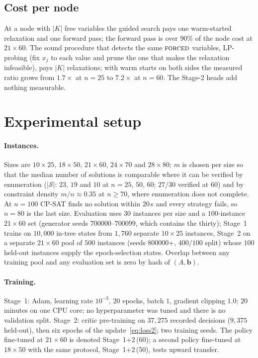 \documentclass[final,5p,times,twocolumn,authoryear]{elsarticle}
\newcommand{\SOL}{\mathcal{S}}
\newcommand{\FORCED}{\textsc{forced}}
\begin{document}
\subsection{Cost per node}
\label{sec:method-cost}

At a node with $|K|$ free variables the guided search pays one warm-started relaxation and one forward pass; the forward pass is over $90\%$ of the node cost at $21\times60$. The sound procedure that detects the same $\FORCED$ variables, LP-probing (fix $x_j$ to each value and prune the one that makes the relaxation infeasible), pays $|K|$ relaxations; with warm starts on both sides the measured ratio grows from $1.7\times$ at $n=25$ to $7.2\times$ at $n=60$. The Stage-2 heads add nothing measurable.

\section{Experimental setup}
\label{sec:setup}

\paragraph{Instances.} Sizes are $10\times25$, $18\times50$, $21\times60$, $24\times70$ and $28\times80$; $m$ is chosen per size so that the median number of solutions is comparable where it can be verified by enumeration ($|\SOL|$: $23$, $19$ and $10$ at $n=25$, $50$, $60$; $27/30$ verified at $60$) and by constraint density $m/n\approx0.35$ at $n\ge70$, where enumeration does not complete. At $n=100$ CP-SAT finds no solution within $20$\,s and every strategy fails, so $n=80$ is the last size. Evaluation uses $30$ instances per size and a $100$-instance $21\times60$ set (generator seeds $700000$--$700099$, which contains the thirty); Stage~1 trains on $10{,}000$ in-tree states from $1{,}760$ separate $10\times25$ instances, Stage~2 on a separate $21\times60$ pool of $500$ instances (seeds $800000$+, $400/100$ split) whose $100$ held-out instances supply the epoch-selection states. Overlap between any training pool and any evaluation set is zero by hash of $(A,\mathbf{b})$.

\paragraph{Training.} Stage~1: Adam, learning rate $10^{-3}$, $20$ epochs, batch $1$, gradient clipping $1.0$; $20$ minutes on one CPU core; no hyperparameter was tuned and there is no validation split. Stage~2: critic pre-training on $37{,}275$ recorded decisions ($9{,}375$ held-out), then six epochs of the update~\eqref{eq:loss2}; two training seeds. The policy fine-tuned at $21\times60$ is denoted Stage~1+2\,(60); a second policy fine-tuned at $18\times50$ with the same protocol, Stage~1+2\,(50), tests upward transfer.
\end{document}
